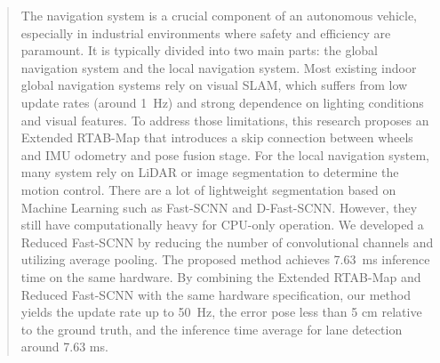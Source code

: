 \documentclass[conference, a4paper]{IEEEtran}[2015/08/26]
\begin{document}

\begin{abstract}
	The navigation system is a crucial component of an autonomous vehicle, especially in industrial environments where safety and efficiency are paramount. It is typically divided into two main parts: the global navigation system and the local navigation system. Most existing indoor global navigation systems rely on visual SLAM, which suffers from low update rates (around 1~Hz) and strong dependence on lighting conditions and visual features. To address those limitations, this research proposes an Extended RTAB-Map that introduces a skip connection between wheels and IMU odometry and pose fusion stage. For the local navigation system, many system rely on LiDAR or image segmentation to determine the motion control. There are a lot of lightweight segmentation based on Machine Learning such as Fast-SCNN and D-Fast-SCNN. However, they still have computationally heavy for CPU-only operation. We developed a Reduced Fast-SCNN by reducing the number of convolutional channels and utilizing average pooling. The proposed method achieves 7.63~ms inference time on the same hardware. By combining the Extended RTAB-Map and Reduced Fast-SCNN with the same hardware specification, our method yields the update rate up to 50~Hz, the error pose less than 5 cm relative to the ground truth, and the inference time average for lane detection around 7.63 ms. 
	\end{abstract}
\end{document}
